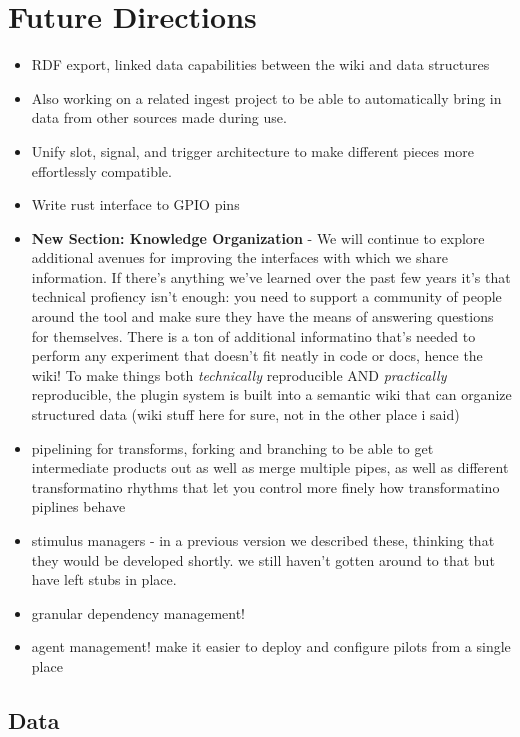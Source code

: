 \section{Future Directions}

\begin{itemize}
\item RDF export, linked data capabilities between the wiki and data structures
\item Also working on a related ingest project to be able to automatically bring in data from other sources made during use. 
\item Unify slot, signal, and trigger architecture to make different pieces more effortlessly compatible.
\item Write rust interface to GPIO pins
\item \textbf{New Section: Knowledge Organization} - We will continue to explore additional avenues for improving the interfaces with which we share information. If there's anything we've learned over the past few years it's that technical profiency isn't enough: you need to support a community of people around the tool and make sure they have the means of answering questions for themselves. There is a ton of additional informatino that's needed to perform any experiment that doesn't fit neatly in code or docs, hence the wiki! To make things both \textit{technically} reproducible AND \textit{practically} reproducible, the plugin system is built into a semantic wiki that can organize structured data (wiki stuff here for sure, not in the other place i said)
\item pipelining for transforms, forking and branching to be able to get intermediate products out as well as merge multiple pipes, as well as different transformatino rhythms that let you control more finely how transformatino piplines behave
\item stimulus managers - in a previous version we described these, thinking that they would be developed shortly. we still haven't gotten around to that but have left stubs in place.
\item granular dependency management!
\item agent management! make it easier to deploy and configure pilots from a single place
\end{itemize}


\subsection{Data}

